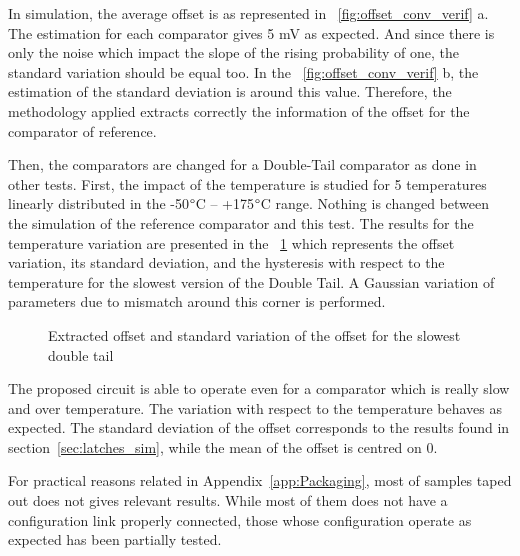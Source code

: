 In simulation, the average offset is as represented in \figurename~\ref{fig:offset_conv_verif} a. The estimation for each comparator gives 5 mV as expected. And since there is only the noise which impact the slope of the rising probability of one, the standard variation should be equal too. In the \figurename~\ref{fig:offset_conv_verif} b, the estimation of the standard deviation is around this value. Therefore, the methodology applied extracts correctly the information of the offset for the comparator of reference.

Then, the comparators are changed for a Double-Tail comparator as done in other tests. First, the impact of the temperature is studied for 5 temperatures linearly distributed in the -50$\degree$C -- +175$\degree$C range. Nothing is changed between the simulation of the reference comparator and this test.
The results for the temperature variation are presented in the \figurename~\ref{fig:offset_conv_dtl} which represents the offset variation, its standard deviation, and the hysteresis with respect to the temperature for the slowest version of the Double Tail. A Gaussian variation of parameters due to mismatch around this corner is performed.

\begin{figure}[htp]
    \centering
    \begin{subfigure}[b]{0.32\textwidth}
    \end{subfigure}
    \begin{subfigure}[b]{0.32\textwidth}
    \end{subfigure}
    \begin{subfigure}[b]{0.32\textwidth}
    \end{subfigure}
    \caption{Extracted offset and standard variation of the offset for the slowest double tail}
    \label{fig:offset_conv_dtl}
\end{figure}

The proposed circuit is able to operate even for a comparator which is really slow and over temperature. The variation with respect to the temperature behaves as expected. The standard deviation of the offset corresponds to the results found in section~\ref{sec:latches_sim}, while the mean of the offset is centred on 0.

For practical reasons related in Appendix~\ref{app:Packaging}, most of samples taped out does not gives relevant results. While most of them does not have a configuration link properly connected, those whose configuration operate as expected has been partially tested. 
